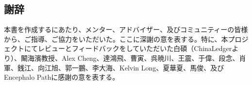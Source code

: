 \documentclass{article}
\makeatletter
\newenvironment{figurehere}
 {\def\@captype{figure}}
 {}
\makeatother
\begin{document}
\begin{multicols}{2}
\section{謝辞}
本書を作成するにあたり、メンター、アドバイザー、及びコミュニティーの皆様から、ご指導、ご協力をいただいた。ここに深謝の意を表する。特に、本プロジェクトにてレビューとフィードバックをしていただいた白碩（ChinaLedgerより）、闞海濱教授、Alex Cheng、達鴻飛、曹寅、呉暁川、王震、于偉、段念、肖軍、銭江、向江旭、郭一鵬、李大海、Kelvin Long、夏華夏、馬俊、及びEncephalo Pathに感謝の意を表する。






\end{multicols}


%
%
%
%
%
%
%
\end{document}
